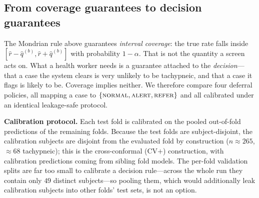 %


\subsection{From coverage guarantees to decision guarantees}\label{sec:decguar}
The Mondrian rule above guarantees \emph{interval coverage}: the true rate falls inside
$[\hat r - \hat q^{(b)}, \hat r + \hat q^{(b)}]$ with probability $1-\alpha$. That is not the quantity a
screen acts on. What a health worker needs is a guarantee attached to the \emph{decision}---that a case
the system clears is very unlikely to be tachypneic, and that a case it flags is likely to be. Coverage
implies neither. We therefore compare four deferral policies, all mapping a case to
$\{\textsc{normal}, \textsc{alert}, \textsc{refer}\}$ and all calibrated under an identical
leakage-safe protocol.

\textbf{Calibration protocol.} Each test fold is calibrated on the pooled out-of-fold predictions of the
remaining folds. Because the test folds are subject-disjoint, the calibration subjects are disjoint from
the evaluated fold by construction ($n\!\approx\!265$, $\approx\!68$ tachypneic); this is the
cross-conformal (CV$+$) construction, with calibration predictions coming from sibling fold models. The
per-fold validation splits are far too small to calibrate a decision rule---across the whole run they
contain only $49$ distinct subjects---so pooling them, which would additionally leak calibration subjects
into other folds' test sets, is not an option.

